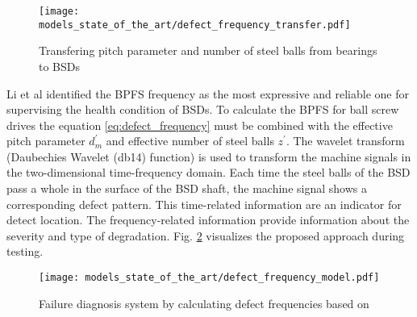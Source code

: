 \begin{figure}[H]
  \centering
  \texttt{[image: models\_state\_of\_the\_art/defect\_frequency\_transfer.pdf]}
  \caption{Transfering pitch parameter and number of steel balls from bearings to BSDs \cite{Lee2015}}
  \label{fig:defect_frequency_transfer}
\end{figure}

Li et al identified the BPFS frequency as the most expressive and reliable one for supervising the health condition of BSDs. To calculate the BPFS for ball screw drives the equation \ref{eq:defect_frequency} must be combined with the effective pitch parameter $d_{m}^{'}$ and effective number of steel balls $z^{'}$. The wavelet transform (Daubechies Wavelet (db14) function) is used to transform the machine signals in the two-dimensional time-frequency domain. Each time the steel balls of the BSD pass a whole in the surface of the BSD shaft, the machine signal shows a corresponding defect pattern. This time-related information are an indicator for detect location. The frequency-related information provide information about the severity and type of degradation. Fig. \ref{fig:defect_frequency_model} visualizes the proposed approach during testing.

\begin{figure}[H]
  \centering
  \texttt{[image: models\_state\_of\_the\_art/defect\_frequency\_model.pdf]}
  \caption{Failure diagnosis system by calculating defect frequencies based on \cite{Lee2015}}
  \label{fig:defect_frequency_model}
\end{figure}

